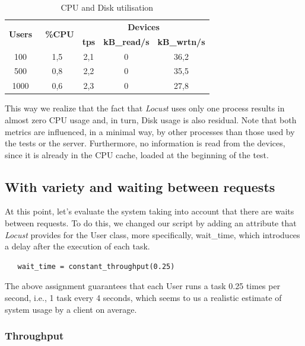   \newpage

\begin{table}[h!]
\centering
\begin{tabular}{|c|c|c|c|c|} 
\hline
\multirow{2}{*}{\textbf{Users }} & \multirow{2}{*}{\textbf{~\%CPU}} & \multicolumn{3}{c|}{\textbf{Devices}}                     \\ 
\cline{3-5}
                                 &                                  & \textbf{tps} & \textbf{kB\_read/s} & \textbf{kB\_wrtn/s}  \\ 
\hline
100  & 1,5 & 2,1  & 0  &  36,2                  \\ 
\hline
500  & 0,8 & 2,2 & 0 & 35,5                   \\ 
\hline
1000 & 0,6 & 2,3 & 0 & 27,8                 \\ 
\hline
\end{tabular}\caption{\label{tab:cpu_normal}CPU and Disk utilisation}
\end{table}


This way we realize that the fact that \textit{Locust} uses only one process results in almost zero CPU usage and, in turn, Disk usage is also residual. Note that both metrics are influenced, in a minimal way, by other processes than those used by the tests or the server. Furthermore, no information is read from the devices, since it is already in the CPU cache, loaded at the beginning of the test.
  
  
  \subsection{With variety and waiting between requests}
  
  At this point, let's evaluate the system taking into account that there are waits between requests. To do this, we changed our script by adding an attribute that \textit{Locust} provides for the User class, more specifically, wait\_time, which introduces a delay after the execution of each task.
    
  \begin{verbatim}
   wait_time = constant_throughput(0.25)
  \end{verbatim}
  
  The above assignment guarantees that each User runs a task 0.25 times per second, i.e., 1 task every 4 seconds, which seems to us a realistic estimate of system usage by a client on average.

  \subsubsection{Throughput}
  
